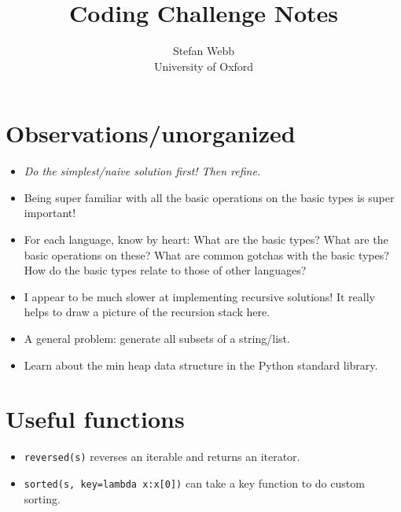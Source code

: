 \documentclass[12pt]{article}
\title{Coding Challenge Notes}
\author{
  Stefan Webb \\
  University of Oxford \\
}
\begin{document}
\lstset{language=Python,xleftmargin=12pt,basicstyle=\ttfamily\footnotesize,aboveskip=-6pt, belowskip=0pt,tabsize=2,breaklines=true}
\newcommand{\python}[1]{\lstinline[columns=fixed]{#1}}

\suppressfloats

\setlength{\abovedisplayskip}{3.5pt}
\setlength{\belowdisplayskip}{3.5pt}
\setlength{\abovedisplayshortskip}{3.5pt}
\setlength{\belowdisplayshortskip}{3.5pt}	

\maketitle

%  

\section{Observations/unorganized}
\begin{itemize}
  \item \emph{Do the simplest/naive solution first! Then refine.}
  \item Being super familiar with all the basic operations on the basic types is super important!
  \item For each language, know by heart: What are the basic types? What are the basic operations on these? What are common gotchas with the basic types? How do the basic types relate to those of other languages?
  \item I appear to be much slower at implementing recursive solutions! It really helps to draw a picture of the recursion stack here.
  \item A general problem: generate all subsets of a string/list.
  \item Learn about the min heap data structure in the Python standard library.
\end{itemize}

\section{Useful functions}
\begin{itemize}
  \item \python{reversed(s)} reverses an iterable and returns an iterator.
  \item \python{sorted(s, key=lambda x:x[0])} can take a key function to do custom sorting.
\end{itemize}
\end{document}
